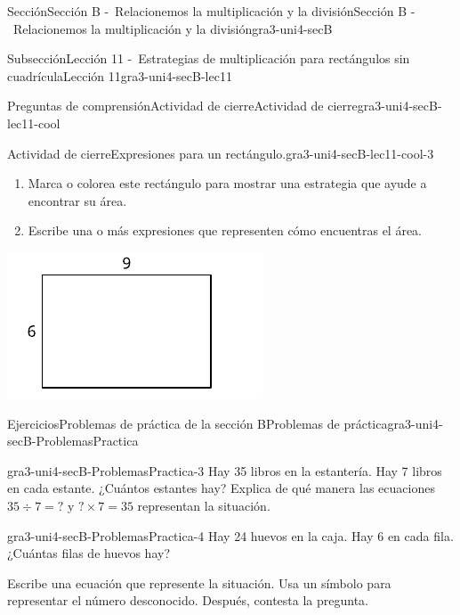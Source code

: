 \documentclass[twoside,10pt,]{article}
\begin{document}
\begin{sectionptx}{Sección}{Sección B -~Relacionemos la multiplicación y la división}{}{Sección B -~Relacionemos la multiplicación y la división}{}{}{gra3-uni4-secB}
\begin{subsectionptx}{Subsección}{Lección 11 -~Estrategias de multiplicación para rectángulos sin cuadrícula}{}{Lección 11}{}{}{gra3-uni4-secB-lec11}
\begin{reading-questions-subsubsection}{Preguntas de comprensión}{Actividad de cierre}{}{Actividad de cierre}{}{}{gra3-uni4-secB-lec11-cool}
\begin{project}{Actividad de cierre}{Expresiones para un rectángulo.}{gra3-uni4-secB-lec11-cool-3}
\begin{sidebyside}{2}{0}{0}{0}
\begin{sbspanel}{0.6}
%
\begin{enumerate}[label=(\alph*)]
\item{}Marca o colorea este rectángulo para mostrar una estrategia que ayude a encontrar su área.%
\item{}Escribe una o más expresiones que representen cómo encuentras el área.%
\end{enumerate}
\end{sbspanel}%
\begin{sbspanel}{0.4}%
\includegraphics[width=\linewidth]{external/svg-source/tikz-file-158678.pdf}
\end{sbspanel}%
\end{sidebyside}%
\end{project}%
\end{reading-questions-subsubsection}
\end{subsectionptx}
%
%
\typeout{************************************************}
\typeout{************************************************}
%
\begin{exercises-subsection}{Ejercicios}{Problemas de práctica de la sección B}{}{Problemas de práctica}{}{}{gra3-uni4-secB-ProblemasPractica}
\begin{divisionexercise}{1}{}{}{gra3-uni4-secB-ProblemasPractica-3}%
Hay 35 libros en la estantería. Hay 7 libros en cada estante. ¿Cuántos estantes hay? Explica de qué manera las ecuaciones \(35 ÷ 7 = {?}\) y \({?} × 7 = 35\) representan la situación.%
\end{divisionexercise}%
\begin{divisionexercise}{2}{}{}{gra3-uni4-secB-ProblemasPractica-4}%
Hay 24 huevos en la caja. Hay 6 en cada fila. ¿Cuántas filas de huevos hay?%
\par
Escribe una ecuación que represente la situación. Usa un símbolo para representar el número desconocido. Después, contesta la pregunta.%

\end{divisionexercise}
\end{exercises-subsection}
\end{sectionptx}
\end{document}

